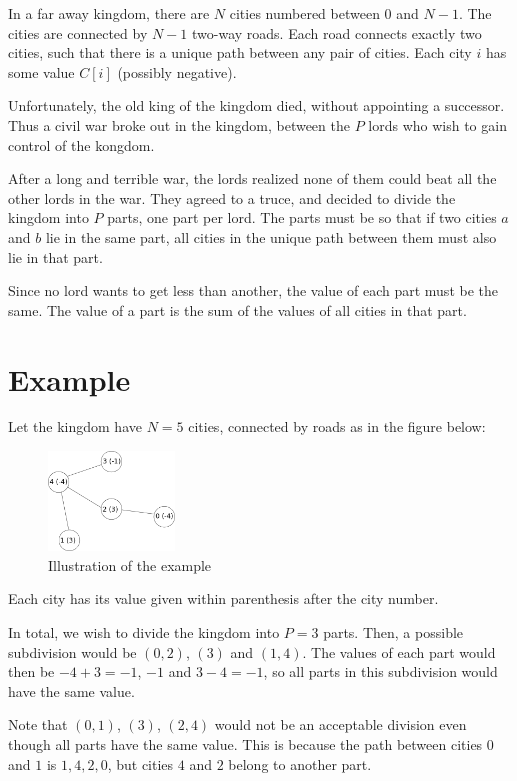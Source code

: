 \newcommand\version{v2}
In a far away kingdom, there are $N$ cities numbered between $0$ and $N - 1$.
The cities are connected by $N - 1$ two-way roads.
Each road connects exactly two cities, such that there is a unique path between any pair of cities. Each city $i$ has some value $C[i]$ (possibly negative).

Unfortunately, the old king of the kingdom died, without appointing a successor. Thus a civil war broke out in the kingdom, between the $P$ lords who wish to gain control of the kongdom.

After a long and terrible war, the lords realized none of them could beat all the other lords in the war. They agreed to a truce, and decided to divide the kingdom into $P$ parts, one part per lord. The parts must be so that if two cities $a$ and $b$ lie in the same part, all cities in the unique path between them must also lie in that part.

Since no lord wants to get less than another, the value of each part must be the same. The value of a part is the sum of the values of all cities in that part.

\section*{Example}
Let the kingdom have $N = 5$ cities, connected by roads as in the figure below:
\begin{figure}[h!]
  \centering
  \includegraphics[width=0.3\textwidth]{sample.png}
  \caption{Illustration of the example}
\end{figure}
Each city has its value given within parenthesis after the city number.

In total, we wish to divide the kingdom into $P = 3$ parts.
Then, a possible subdivision would be $(0, 2)$, $(3)$ and $(1, 4)$.
The values of each part would then be $-4 + 3 = -1$, $-1$ and $3 - 4 = -1$,
so all parts in this subdivision would have the same value.

Note that $(0, 1)$, $(3)$, $(2, 4)$ would not be an acceptable division even
though all parts have the same value. This is because the path between cities
$0$ and $1$ is $1, 4, 2, 0$, but cities $4$ and $2$ belong to another part.

